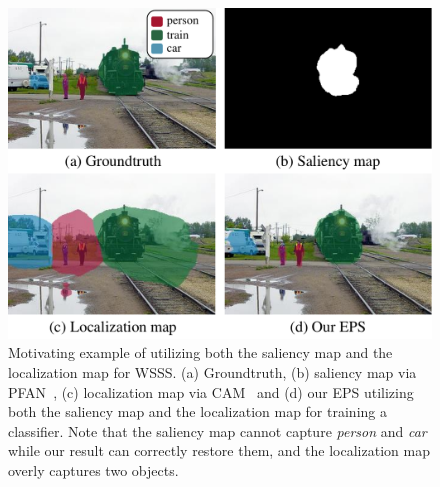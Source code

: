 \begin{figure}[t]
\centering
\includegraphics[width=8 cm]{figures/fig_concept.pdf}
\caption{Motivating example of utilizing both the saliency map and the localization map for WSSS. (a) Groundtruth, (b) saliency map via PFAN~\cite{zhao2019pyramid}, (c) localization map via CAM~\cite{zhou2016learning} and (d) our EPS utilizing both the saliency map and the localization map for training a classifier. Note that the saliency map cannot capture \emph{person} and \emph{car} while our result can correctly restore them, and the localization map overly captures two objects.} \vspace{-2mm}
\label{fig:concept}
\end{figure}
